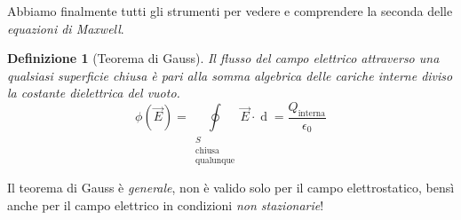 \documentclass[a4paper,12pt,titlepage,openany]{book}
\theoremstyle{mydef}
\newtheorem{definizione}{Definizione}[chapter]
\begin{document}
            \noindent
            Abbiamo finalmente tutti gli strumenti per vedere e comprendere la seconda delle \emph{equazioni di Maxwell}.
            \begin{definizione}[Teorema di Gauss]
                Il flusso del campo elettrico attraverso una qualsiasi superficie chiusa è pari alla somma algebrica delle cariche interne
                diviso la costante dielettrica del vuoto.
                \begin{equation}
                    \boxed{\phi(\vec{E}) = \oint\limits_{\substack{S\\\text{chiusa}\\\text{qualunque}}}\vec{E}\cdot\mathop{d\vec{S}} = \frac{Q_{\text{interna}}}{\epsilon_0}}
                \end{equation}
            \end{definizione}
            \noindent
            Il teorema di Gauss è \emph{generale}, non è valido solo per il campo elettrostatico, bensì anche per il campo elettrico in condizioni \emph{non stazionarie}!
            
\end{document}
